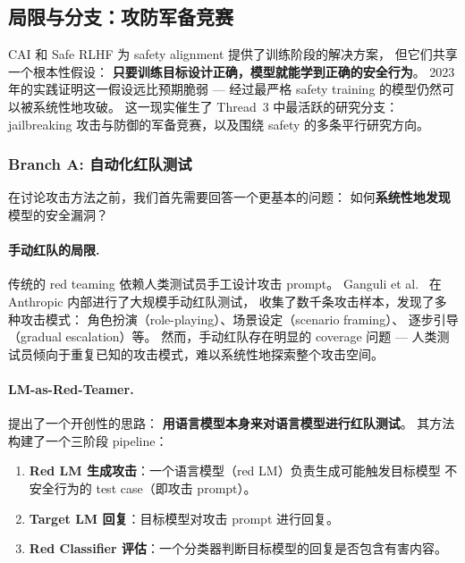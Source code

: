 \subsection{局限与分支：攻防军备竞赛}
\label{sec:t3-branches}

CAI 和 Safe RLHF 为 safety alignment 提供了训练阶段的解决方案，
但它们共享一个根本性假设：
\textbf{只要训练目标设计正确，模型就能学到正确的安全行为}。
2023 年的实践证明这一假设远比预期脆弱 ---
经过最严格 safety training 的模型仍然可以被系统性地攻破。
这一现实催生了 Thread~3 中最活跃的研究分支：
jailbreaking 攻击与防御的军备竞赛，以及围绕 safety 的多条平行研究方向。

\subsubsection{Branch A: 自动化红队测试}
\label{sec:t3-redteam}

在讨论攻击方法之前，我们首先需要回答一个更基本的问题：
如何\textbf{系统性地发现}模型的安全漏洞？

\paragraph{手动红队的局限.}
传统的 red teaming 依赖人类测试员手工设计攻击 prompt。
Ganguli et al.\ \cite{ganguli2022redteaming} 在 Anthropic 内部进行了大规模手动红队测试，
收集了数千条攻击样本，发现了多种攻击模式：
角色扮演（role-playing）、场景设定（scenario framing）、
逐步引导（gradual escalation）等。
然而，手动红队存在明显的 coverage 问题 ---
人类测试员倾向于重复已知的攻击模式，难以系统性地探索整个攻击空间。

\paragraph{LM-as-Red-Teamer.}
 提出了一个开创性的思路：
\textbf{用语言模型本身来对语言模型进行红队测试}。
其方法构建了一个三阶段 pipeline：

\begin{enumerate}[leftmargin=2em]
  \item \textbf{Red LM 生成攻击}：一个语言模型（red LM）负责生成可能触发目标模型
    不安全行为的 test case（即攻击 prompt）。
  \item \textbf{Target LM 回复}：目标模型对攻击 prompt 进行回复。
  \item \textbf{Red Classifier 评估}：一个分类器判断目标模型的回复是否包含有害内容。
\end{enumerate}

